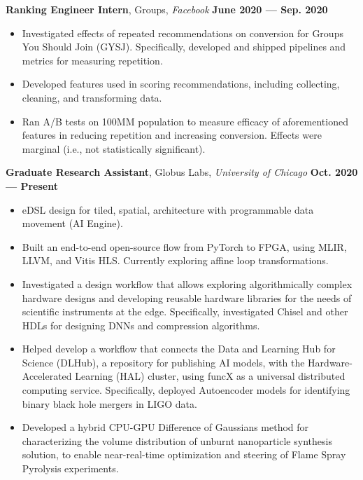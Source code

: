 \documentclass[11pt,letterpaper,roman,colorlinks,linkcolor=blue]{moderncv}
\begin{document}
\textbf{Ranking Engineer Intern}, Groups, \emph{Facebook}
\hfill \textbf{June 2020 --- Sep. 2020}
\begin{itemize}
\item Investigated effects of repeated recommendations on conversion for Groups You Should Join (GYSJ). Specifically, developed and shipped pipelines and metrics for measuring repetition. 
\item Developed features used in scoring recommendations, including collecting, cleaning, and transforming data.
\item Ran A/B tests on 100MM population to measure efficacy of aforementioned features in reducing repetition and increasing conversion. Effects were marginal (i.e., not statistically significant).
\end{itemize}

\textbf{Graduate Research Assistant}, Globus Labs, \emph{University of Chicago}
\hfill \textbf{Oct. 2020 --- Present}
\begin{itemize}
\item eDSL design for tiled, spatial, architecture with programmable data movement (AI Engine).
\item Built an end-to-end open-source flow from PyTorch to FPGA, using MLIR, LLVM, and Vitis HLS. Currently exploring affine loop transformations.
\item Investigated a design workflow that allows exploring algorithmically complex hardware designs and developing reusable hardware libraries for the needs of scientific instruments at the edge. Specifically, investigated Chisel and other HDLs for designing DNNs and compression algorithms.
\item Helped develop a workflow that connects the Data and Learning Hub for Science (DLHub), a repository for publishing AI models, with the Hardware-Accelerated Learning (HAL) cluster, using funcX as a universal distributed computing service. Specifically, deployed Autoencoder models for identifying binary black hole mergers in LIGO data.
\item Developed a hybrid CPU-GPU Difference of Gaussians method for characterizing the volume distribution of unburnt nanoparticle synthesis solution, to enable near-real-time optimization and steering of Flame Spray Pyrolysis experiments.\end{itemize}

\end{document}
